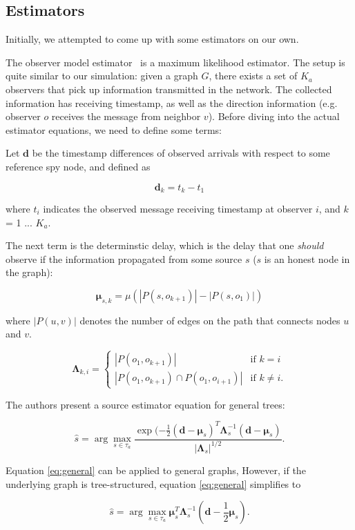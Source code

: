\subsection{Estimators}
Initially, we attempted to come up with some estimators on our own. 

The observer model estimator~\cite{pinto} is a maximum likelihood estimator. The setup is quite similar to our simulation: given a graph $G$, there exists a set of $K_a$ observers that pick up information transmitted in the network. The collected information has receiving timestamp, as well as the direction information (e.g. observer $o$ receives the message from neighbor $v$). Before diving into the actual estimator equations, we need to define some terms:

Let $\boldsymbol{d}$ be the timestamp differences of observed arrivals with respect to some reference spy node, and defined as

\begin{equation}
  \boldsymbol{d}_k = t_{k} - t_1
\end{equation}

where $t_i$ indicates the observed message receiving timestamp at observer $i$, and $k$ = 1 ... $K_a$.

The next term is the determinstic delay, which is the delay that one \emph{should} observe if the information propagated from some source $s$ ($s$ is an honest node in the graph):

\begin{equation}
  \boldsymbol{\mu}_{s,k} = \mu (|P(s, o_{k+1})| - |P(s, o_1)|)
\end{equation}

where $|P(u, v)|$ denotes the number of edges on the path that connects nodes $u$ and $v$. 

\begin{equation}
  \boldsymbol{\Lambda}_{k, i} = \begin{cases}
    |P(o_1, o_{k+1})| & \text{if $k = i$} \\
    |P(o_1, o_{k+1}) \cap P(o_1, o_{i+1})| & \text{if $k \neq i$}.
  \end{cases}
\end{equation}


The authors present a source estimator equation for general trees:

\begin{equation}
\label{eq:general}
\hat{s} = \arg\max_{s \in \tau_{a}} \dfrac{\exp(-\frac{1}{2} (\boldsymbol{d} - \boldsymbol{\mu}_{s})^{T} \boldsymbol{\Lambda}_s^{-1} (\boldsymbol{d} - \boldsymbol{\mu}_s) }{|\boldsymbol{\Lambda}_s|^{1/2}}.
\end{equation}

Equation \ref{eq:general} can be applied to general graphs, However, if the underlying graph is tree-structured, equation \ref{eq:general} simplifies to

\begin{equation}
\label{eq:tree}
\hat{s} = \arg\max_{s \in \tau_{a}} \boldsymbol{\mu}_{s}^{T} \boldsymbol{\Lambda}_s^{-1} (\boldsymbol{d} - \frac{1}{2}\boldsymbol{\mu}_s).
\end{equation}

